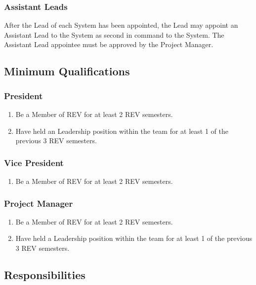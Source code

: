 \subsubsection{Assistant Leads}
\label{roles:appointed:assistant}
After the Lead of each System has been appointed, the Lead may appoint an Assistant Lead to the System as second in command to the System. The Assistant Lead appointee must be approved by the Project Manager.

\subsection{Minimum Qualifications}
\label{roles:qualifications}

\subsubsection{President}
\label{roles:qualifications:president}
\begin{enumerate}
\item Be a Member of REV for at least 2 REV semesters.
\item Have held an Leadership position within the team for at least 1 of the previous 3 REV semesters.
\end{enumerate}

\subsubsection{Vice President}
\label{roles:qualifications:vice}
\begin{enumerate}
\item Be a Member of REV for at least 2 REV semesters.
\end{enumerate}

\subsubsection{Project Manager}
\label{roles:qualifications:pm}
\begin{enumerate}
\item Be a Member of REV for at least 2 REV semesters.
\item Have held a Leadership position within the team for at least 1 of the previous 3 REV semesters.
\end{enumerate}

\subsection{Responsibilities}
\label{roles:responsibilities}

